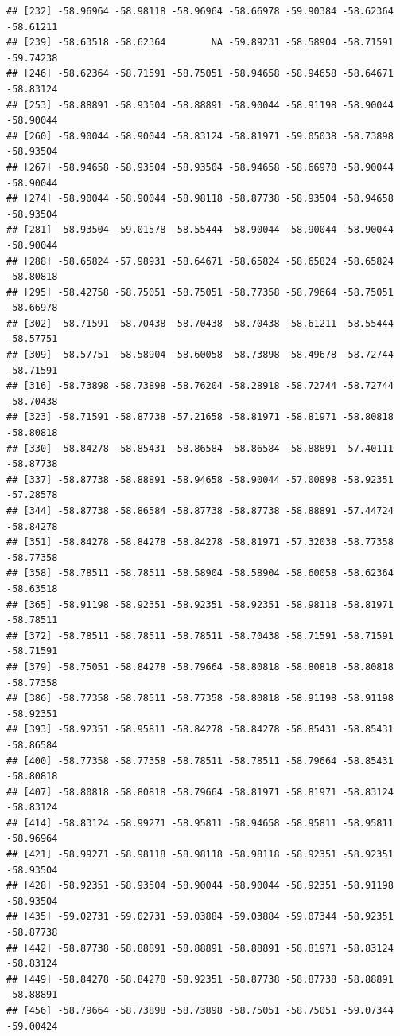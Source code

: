 \documentclass[
]{article}
\begin{document}
\begin{verbatim}
## [232] -58.96964 -58.98118 -58.96964 -58.66978 -59.90384 -58.62364 -58.61211
## [239] -58.63518 -58.62364        NA -59.89231 -58.58904 -58.71591 -59.74238
## [246] -58.62364 -58.71591 -58.75051 -58.94658 -58.94658 -58.64671 -58.83124
## [253] -58.88891 -58.93504 -58.88891 -58.90044 -58.91198 -58.90044 -58.90044
## [260] -58.90044 -58.90044 -58.83124 -58.81971 -59.05038 -58.73898 -58.93504
## [267] -58.94658 -58.93504 -58.93504 -58.94658 -58.66978 -58.90044 -58.90044
## [274] -58.90044 -58.90044 -58.98118 -58.87738 -58.93504 -58.94658 -58.93504
## [281] -58.93504 -59.01578 -58.55444 -58.90044 -58.90044 -58.90044 -58.90044
## [288] -58.65824 -57.98931 -58.64671 -58.65824 -58.65824 -58.65824 -58.80818
## [295] -58.42758 -58.75051 -58.75051 -58.77358 -58.79664 -58.75051 -58.66978
## [302] -58.71591 -58.70438 -58.70438 -58.70438 -58.61211 -58.55444 -58.57751
## [309] -58.57751 -58.58904 -58.60058 -58.73898 -58.49678 -58.72744 -58.71591
## [316] -58.73898 -58.73898 -58.76204 -58.28918 -58.72744 -58.72744 -58.70438
## [323] -58.71591 -58.87738 -57.21658 -58.81971 -58.81971 -58.80818 -58.80818
## [330] -58.84278 -58.85431 -58.86584 -58.86584 -58.88891 -57.40111 -58.87738
## [337] -58.87738 -58.88891 -58.94658 -58.90044 -57.00898 -58.92351 -57.28578
## [344] -58.87738 -58.86584 -58.87738 -58.87738 -58.88891 -57.44724 -58.84278
## [351] -58.84278 -58.84278 -58.84278 -58.81971 -57.32038 -58.77358 -58.77358
## [358] -58.78511 -58.78511 -58.58904 -58.58904 -58.60058 -58.62364 -58.63518
## [365] -58.91198 -58.92351 -58.92351 -58.92351 -58.98118 -58.81971 -58.78511
## [372] -58.78511 -58.78511 -58.78511 -58.70438 -58.71591 -58.71591 -58.71591
## [379] -58.75051 -58.84278 -58.79664 -58.80818 -58.80818 -58.80818 -58.77358
## [386] -58.77358 -58.78511 -58.77358 -58.80818 -58.91198 -58.91198 -58.92351
## [393] -58.92351 -58.95811 -58.84278 -58.84278 -58.85431 -58.85431 -58.86584
## [400] -58.77358 -58.77358 -58.78511 -58.78511 -58.79664 -58.85431 -58.80818
## [407] -58.80818 -58.80818 -58.79664 -58.81971 -58.81971 -58.83124 -58.83124
## [414] -58.83124 -58.99271 -58.95811 -58.94658 -58.95811 -58.95811 -58.96964
## [421] -58.99271 -58.98118 -58.98118 -58.98118 -58.92351 -58.92351 -58.93504
## [428] -58.92351 -58.93504 -58.90044 -58.90044 -58.92351 -58.91198 -58.93504
## [435] -59.02731 -59.02731 -59.03884 -59.03884 -59.07344 -58.92351 -58.87738
## [442] -58.87738 -58.88891 -58.88891 -58.88891 -58.81971 -58.83124 -58.83124
## [449] -58.84278 -58.84278 -58.92351 -58.87738 -58.87738 -58.88891 -58.88891
## [456] -58.79664 -58.73898 -58.73898 -58.75051 -58.75051 -59.07344 -59.00424

\end{verbatim}
\end{document}
